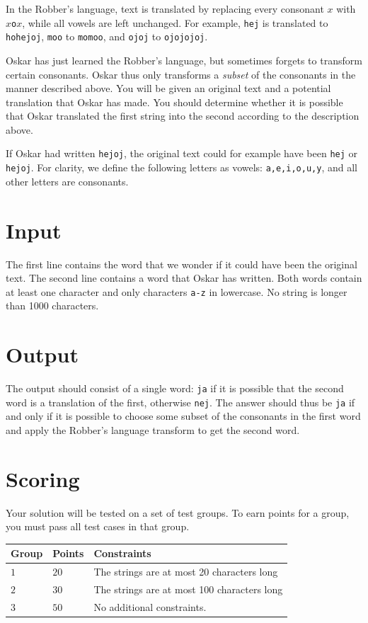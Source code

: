 In the Robber's language, text is translated by replacing every consonant $x$ with $x$\texttt{o}$x$, while all vowels are left unchanged.
For example, \texttt{hej} is translated to \texttt{hohejoj}, \texttt{moo} to \texttt{momoo}, and \texttt{ojoj} to \texttt{ojojojoj}.

Oskar has just learned the Robber's language, but sometimes forgets to transform certain consonants. Oskar thus only transforms a \emph{subset} of the consonants in the manner described above.
You will be given an original text and a potential translation that Oskar has made. You should determine whether it is possible that Oskar translated the first string into the second according to the description above.

If Oskar had written \texttt{hejoj}, the original text could for example have been \texttt{hej} or \texttt{hejoj}.
For clarity, we define the following letters as vowels: \texttt{a,e,i,o,u,y}, and all other letters are consonants.

\section*{Input}
The first line contains the word that we wonder if it could have been the original text. The second line contains a word that Oskar has written. Both words contain at least one character and only characters \texttt{a-z} in lowercase. No string is longer than 1000 characters.

\section*{Output}
The output should consist of a single word: \texttt{ja} if it is possible that the second word is a translation of the first, otherwise \texttt{nej}.
The answer should thus be \texttt{ja} if and only if it is possible to choose some subset of the consonants in the first word and apply the Robber's language transform to get the second word.

\section*{Scoring}
Your solution will be tested on a set of test groups.
To earn points for a group, you must pass all test cases in that group.

\noindent
\begin{tabular}{| l | l | p{12cm} |}
  \hline
  \textbf{Group} & \textbf{Points} & \textbf{Constraints} \\ \hline
  $1$    & $20$        & The strings are at most 20 characters long \\ \hline 
  $2$    & $30$        & The strings are at most 100 characters long \\ \hline
  $3$    & $50$        & No additional constraints. \\ \hline 
\end{tabular}

